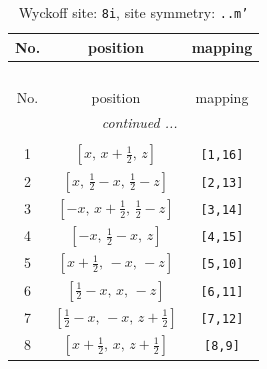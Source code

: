 \documentclass[fleqn,8pt]{jsarticle}
\begin{document}
\begin{longtable}{ccc}
\caption{Wyckoff site: {\tt 8i}, site symmetry: {\tt ..m'}}
 \\
 \hline \hline
No. & position & mapping \\ \hline \endfirsthead

\multicolumn{2}{l}{\tablename\ \thetable{}} \\
 \hline \hline
No. & position & mapping \\ \hline \endhead

 \hline \hline
\multicolumn{2}{r}{\footnotesize\it continued ...} \\ \endfoot

 \hline \hline
\multicolumn{2}{r}{} \\ \endlastfoot

1 & $\left[ x,\, x + \frac{1}{2},\, z \right]$ & {\tt [1,16]} \\ \hline
2 & $\left[ x,\, \frac{1}{2} - x,\, \frac{1}{2} - z \right]$ & {\tt [2,13]} \\ \hline
3 & $\left[ - x,\, x + \frac{1}{2},\, \frac{1}{2} - z \right]$ & {\tt [3,14]} \\ \hline
4 & $\left[ - x,\, \frac{1}{2} - x,\, z \right]$ & {\tt [4,15]} \\ \hline
5 & $\left[ x + \frac{1}{2},\, - x,\, - z \right]$ & {\tt [5,10]} \\ \hline
6 & $\left[ \frac{1}{2} - x,\, x,\, - z \right]$ & {\tt [6,11]} \\ \hline
7 & $\left[ \frac{1}{2} - x,\, - x,\, z + \frac{1}{2} \right]$ & {\tt [7,12]} \\ \hline
8 & $\left[ x + \frac{1}{2},\, x,\, z + \frac{1}{2} \right]$ & {\tt [8,9]} \\
\end{longtable}
\renewcommand{\arraystretch}{1.2}
\end{document}
